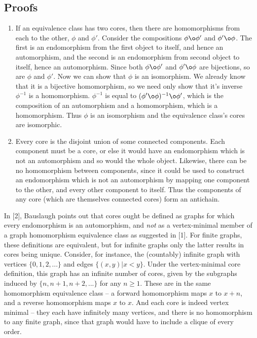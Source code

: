 \documentclass{article}
\newcommand{\compose}{\o}
\begin{document}
\subsection{Proofs}
\begin{enumerate}
\item If an equivalence class has two cores, then there are
  homomorphisms from each to the other, $\phi$ and $\phi'$. Consider
  the compositions $\phi \compose \phi'$ and $\phi' \compose
  \phi$. The first is an endomorphism from the first object to itself,
  and hence an automorphism, and the second is an endomorphism from
  second object to itself, hence an automorphism. Since both $\phi
  \compose \phi'$ and $\phi' \compose \phi$ are bijections, so are
  $\phi$ and $\phi'$. Now we can show that $\phi$ is an
  isomorphism. We already know that it is a bijective homomorphism, so
  we need only show that it's inverse $\phi^{-1}$ is a homomorphism.
  $\phi^{-1}$ is equal to $(\phi' \compose \phi)^{-1} \compose \phi'$,
  which is the composition of an automorphism and a homomorphism,
  which is a homomorphism. Thus $\phi$ is an isomorphism and the
  equivalence class's cores are isomorphic.
\item Every core is the disjoint union of some connected
  components. Each component must be a core, or else it would have an
  endomorphism which is not an automorphism and so would the whole
  object. Likewise, there can be no homomorphism between components,
  since it could be used to construct an endomorphism which is not an
  automorphism by mapping one component to the other, and every other
  component to itself. Thus the components of any core (which are
  themselves connected cores) form an antichain.
\end{enumerate}

In [2], Bauslaugh points out that cores ought be defined as graphs for
which every endomorphism is an automorphism, and \emph{not} as a
vertex-minimal member of a graph homomorphism equivalence class as
suggested in [1]. For finite graphs, these definitions are equivalent,
but for infinite graphs only the latter results in cores being
unique. Consider, for instance, the (countably) infinite graph with
vertices $\{0, 1, 2, ...\}$ and edges $\{(x, y) | x < y\}$. Under the
vertex-minimal core definition, this graph has an infinite number of
cores, given by the subgraphs induced by $\{n, n+1, n+2, ...\}$ for
any $n \geq 1$. These are in the same homomorphism equivalence class
-- a forward homomorphism maps $x$ to $x + n$, and a reverse
homomorphism maps $x$ to $x$. And each core is indeed vertex minimal
-- they each have infinitely many vertices, and there is no
homomorphism to any finite graph, since that graph would have to
include a clique of every order.
\end{document}
